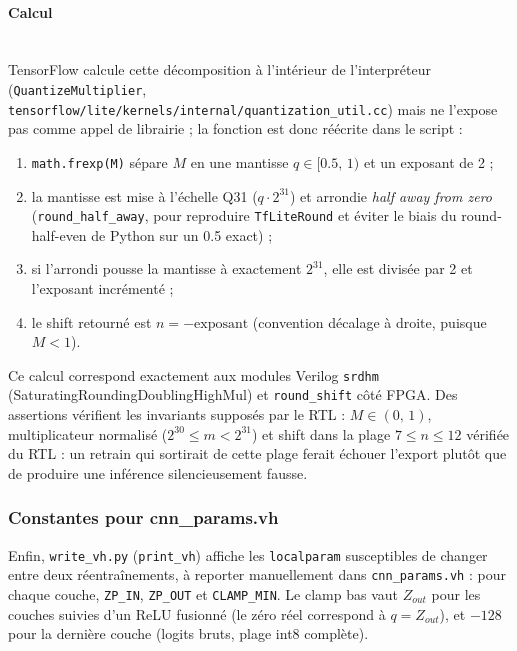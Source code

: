 \documentclass[11pt,a4paper]{article}
\begin{document}
\paragraph{Calcul}\mbox{}\\

TensorFlow calcule cette décomposition à l'intérieur de l'interpréteur
(\texttt{QuantizeMultiplier},
\texttt{tensorflow/lite/kernels/internal/quantization\_util.cc}) mais ne
l'expose pas comme appel de librairie ; la fonction est donc réécrite dans le
script :
\begin{enumerate}
  \item \texttt{math.frexp(M)} sépare $M$ en une mantisse $q \in [0.5,\, 1)$
    et un exposant de 2 ;
  \item la mantisse est mise à l'échelle Q31 ($q \cdot 2^{31}$) et arrondie
    \emph{half away from zero} (\texttt{round\_half\_away}, pour reproduire
    \texttt{TfLiteRound} et éviter le biais du round-half-even de Python sur
    un 0.5 exact) ;
  \item si l'arrondi pousse la mantisse à exactement $2^{31}$, elle est
    divisée par 2 et l'exposant incrémenté ;
  \item le shift retourné est $n = -\text{exposant}$ (convention décalage à
    droite, puisque $M < 1$).
\end{enumerate}

Ce calcul correspond exactement aux modules Verilog \texttt{srdhm}
(SaturatingRoundingDoublingHighMul) et \texttt{round\_shift} côté FPGA. Des
assertions vérifient les invariants supposés par le RTL : $M \in (0,\, 1)$,
multiplicateur normalisé ($2^{30} \le m < 2^{31}$) et shift dans la plage
$7 \le n \le 12$ vérifiée du RTL : un retrain qui sortirait de cette plage
ferait échouer l'export plutôt que de produire une inférence silencieusement
fausse.

\subsubsection{Constantes pour cnn\_params.vh}

Enfin, \texttt{write\_vh.py} (\texttt{print\_vh}) affiche les
\texttt{localparam} susceptibles de changer entre deux réentraînements, à
reporter manuellement dans \texttt{cnn\_params.vh} : pour chaque couche,
\texttt{ZP\_IN}, \texttt{ZP\_OUT} et \texttt{CLAMP\_MIN}. Le clamp bas vaut
$Z_{out}$ pour les couches suivies d'un ReLU fusionné (le zéro réel
correspond à $q = Z_{out}$), et $-128$ pour la dernière couche (logits bruts,
plage int8 complète).
\end{document}
